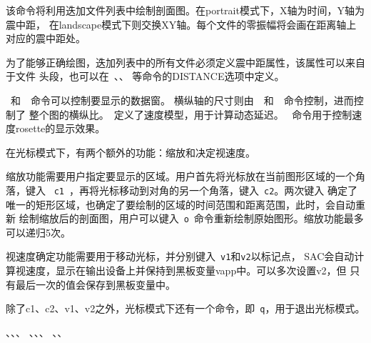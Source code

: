 该命令将利用迭加文件列表中绘制剖面图。在portrait模式下，X轴为时间，Y轴为震中距，
在landscape模式下则交换XY轴。每个文件的零振幅将会画在距离轴上对应的震中距处。

为了能够正确绘图，迭加列表中的所有文件必须定义震中距属性，该属性可以来自于文件
头段，也可以在~、、
等命令的DISTANCE选项中定义。

~和~~命令可以控制要显示的数据窗。
横纵轴的尺寸则由~~和~~命令控制，进而控制了
整个图的横纵比。~定义了速度模型，用于计算动态延迟。
~命令用于控制速度rosette的显示效果。

在光标模式下，有两个额外的功能：缩放和决定视速度。

缩放功能需要用户指定要显示的区域。用户首先将光标放在当前图形区域的一个角落，键入
~\lstinline{c1}~，再将光标移动到对角的另一个角落，键入~\lstinline{c2}。两次键入
确定了唯一的矩形区域，也确定了要绘制的区域的时间范围和距离范围，此时，会自动重新
绘制缩放后的剖面图，用户可以键入~\lstinline{o}~命令重新绘制原始图形。缩放功能最多
可以递归5次。

视速度确定功能需要用于移动光标，并分别键入~\lstinline{v1}和\lstinline{v2}以标记点，
SAC会自动计算视速度，显示在输出设备上并保持到黑板变量vapp中。可以多次设置v2，但
只有最后一次的值会保存到黑板变量中。

除了c1、c2、v1、v2之外，光标模式下还有一个命令，即~\lstinline{q}，用于退出光标模式。

、、、
、、、
、、
